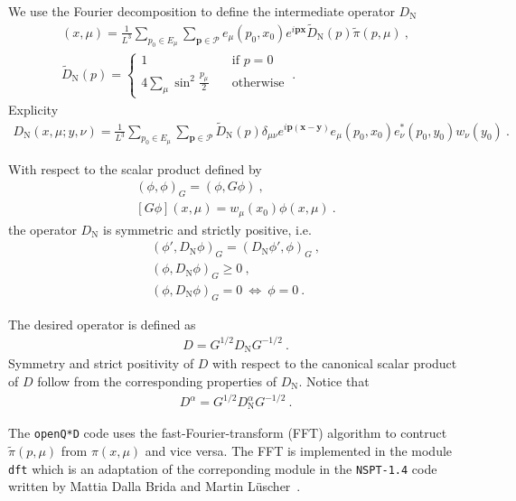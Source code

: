 \documentclass[11pt,fleqn]{article}
\renewcommand{\vec}[1]{\mathbf{#1}}
\begin{document}
We use the Fourier decomposition to define the intermediate operator $D_\text{N}$
\begin{gather}
   [D_\text{N}\pi](x,\mu) = \frac{1}{L^3} \sum_{p_0 \in E_\mu} \sum_{\vec{p} \in \mathcal{P}} e_\mu(p_0,x_0) e^{i \vec{p} \vec{x}} \tilde{D}_\text{N}(p) \tilde{\pi}(p,\mu) \ , \\
   \tilde{D}_\text{N}(p) =
   \begin{cases}
      1 & \text{if } p=0 \\
      4 \sum_\mu \sin^2 \frac{p_\mu}{2} \quad & \text{otherwise}
   \end{cases}
   \ .
\end{gather}
Explicity
\begin{gather}
   D_\text{N}(x,\mu;y,\nu)
   =
   \frac{1}{L^3} \sum_{p_0 \in E_\mu} \sum_{\vec{p} \in \mathcal{P}}
   \tilde{D}_\text{N}(p) \delta_{\mu\nu}
   e^{i \vec{p} (\vec{x}-\vec{y})}
   e_\mu(p_0,x_0) e_\nu^*(p_0,y_0) w_\nu(y_0)
   \ .
\end{gather}

With respect to the scalar product defined by
\begin{gather}
   ( \phi , \phi )_G = (\phi , G \phi) \ , \\
   [G\phi](x,\mu) = w_\mu(x_0) \phi(x,\mu) \ .
\end{gather}
the operator $D_\text{N}$ is symmetric and strictly positive, i.e.
\begin{gather}
   ( \phi' , D_\text{N} \phi )_G = ( D_\text{N} \phi' , \phi )_G
   \ , \\
   ( \phi , D_\text{N} \phi )_G \ge 0
   \ , \\
   ( \phi , D_\text{N} \phi )_G = 0 \ \Leftrightarrow \ \phi = 0
   \ .
\end{gather}

The desired operator is defined as
\begin{gather}
   D = G^{1/2} D_\text{N} G^{-1/2} \ .
\end{gather}
Symmetry and strict positivity of $D$ with respect to the canonical scalar product of $D$ follow from the corresponding properties of $D_\text{N}$. Notice that
\begin{gather}
   D^\alpha = G^{1/2} D_\text{N}^\alpha G^{-1/2} \ .
\end{gather}

The \texttt{openQ*D} code uses the fast-Fourier-transform (FFT) algorithm to contruct $\tilde{\pi}(p,\mu)$ from $\pi(x,\mu)$ and vice versa. The FFT is implemented in the module \texttt{dft} which is an adaptation of the correponding module in the \texttt{NSPT-1.4} code written by Mattia Dalla Brida and Martin L\"uscher~\cite{NSPT}.
\end{document}
